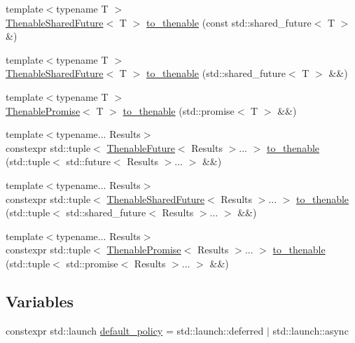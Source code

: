 \begin{DoxyCompactItemize}
\item 
{\footnotesize template$<$typename T $>$ }\\\hyperlink{classthenable_1_1_thenable_shared_future}{Thenable\+Shared\+Future}$<$ T $>$ \hyperlink{namespacethenable_acd73ac744c2c37c705f1cef8b403d741}{to\+\_\+thenable} (const std\+::shared\+\_\+future$<$ T $>$ \&)
\item 
{\footnotesize template$<$typename T $>$ }\\\hyperlink{classthenable_1_1_thenable_shared_future}{Thenable\+Shared\+Future}$<$ T $>$ \hyperlink{namespacethenable_a0f4e0bf4b7ffd222f06570c8d9a56e49}{to\+\_\+thenable} (std\+::shared\+\_\+future$<$ T $>$ \&\&)
\item 
{\footnotesize template$<$typename T $>$ }\\\hyperlink{classthenable_1_1_thenable_promise}{Thenable\+Promise}$<$ T $>$ \hyperlink{namespacethenable_adacd70a08dab010396241390a5571a2c}{to\+\_\+thenable} (std\+::promise$<$ T $>$ \&\&)
\item 
{\footnotesize template$<$typename... Results$>$ }\\constexpr std\+::tuple$<$ \hyperlink{classthenable_1_1_thenable_future}{Thenable\+Future}$<$ Results $>$... $>$ \hyperlink{namespacethenable_a9337c975d6426aaf9f76ad790c3b3a93}{to\+\_\+thenable} (std\+::tuple$<$ std\+::future$<$ Results $>$... $>$ \&\&)
\item 
{\footnotesize template$<$typename... Results$>$ }\\constexpr std\+::tuple$<$ \hyperlink{classthenable_1_1_thenable_shared_future}{Thenable\+Shared\+Future}$<$ Results $>$... $>$ \hyperlink{namespacethenable_a444ece5332d86fa1ded34452ffca0767}{to\+\_\+thenable} (std\+::tuple$<$ std\+::shared\+\_\+future$<$ Results $>$... $>$ \&\&)
\item 
{\footnotesize template$<$typename... Results$>$ }\\constexpr std\+::tuple$<$ \hyperlink{classthenable_1_1_thenable_promise}{Thenable\+Promise}$<$ Results $>$... $>$ \hyperlink{namespacethenable_a18e0e6c5b9a65bad51fb4351ef7bc587}{to\+\_\+thenable} (std\+::tuple$<$ std\+::promise$<$ Results $>$... $>$ \&\&)
\end{DoxyCompactItemize}
\subsection*{Variables}
\begin{DoxyCompactItemize}
\item 
constexpr std\+::launch \hyperlink{namespacethenable_a55a20a452e9ba9c0eff946d9b8636f06}{default\+\_\+policy} = std\+::launch\+::deferred $\vert$ std\+::launch\+::async
\end{DoxyCompactItemize}


